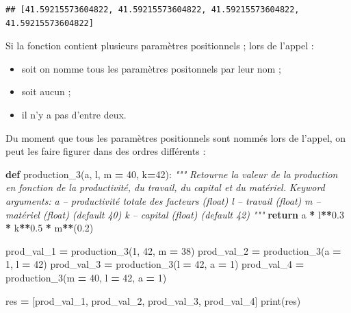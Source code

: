 \documentclass[12pt,]{book}
\newenvironment{Shaded}{\begin{snugshade}}{\end{snugshade}}
\newcommand{\KeywordTok}[1]{\textcolor[rgb]{0.13,0.29,0.53}{\textbf{#1}}}
\newcommand{\DecValTok}[1]{\textcolor[rgb]{0.00,0.00,0.81}{#1}}
\newcommand{\FloatTok}[1]{\textcolor[rgb]{0.00,0.00,0.81}{#1}}
\newcommand{\CommentTok}[1]{\textcolor[rgb]{0.56,0.35,0.01}{\textit{#1}}}
\newcommand{\ControlFlowTok}[1]{\textcolor[rgb]{0.13,0.29,0.53}{\textbf{#1}}}
\newcommand{\OperatorTok}[1]{\textcolor[rgb]{0.81,0.36,0.00}{\textbf{#1}}}
\newcommand{\BuiltInTok}[1]{#1}
\newcommand{\NormalTok}[1]{#1}
\providecommand{\tightlist}{%
  \setlength{\itemsep}{0pt}\setlength{\parskip}{0pt}}
\numberwithin{equation}{section}
\numberwithin{countremarque}{section}
\let\BeginKnitrBlock\begin \let\EndKnitrBlock\end
\begin{document}
\begin{lstlisting}
## [41.59215573604822, 41.59215573604822, 41.59215573604822, 41.59215573604822]
\end{lstlisting}

\BeginKnitrBlock{remarque}
Si la fonction contient plusieurs paramètres positionnels ; lors de
l'appel :

\begin{itemize}
\tightlist
\item
  soit on nomme tous les paramètres positonnels par leur nom ;
\item
  soit aucun ;
\item
  il n'y a pas d'entre deux.
\end{itemize}
\EndKnitrBlock{remarque}

Du moment que tous les paramètres positionnels sont nommés lors de
l'appel, on peut les faire figurer dans des ordres différents :

\begin{Shaded}
\begin{Highlighting}[]
\KeywordTok{def}\NormalTok{ production_3(a, l, m }\OperatorTok{=} \DecValTok{40}\NormalTok{, k}\OperatorTok{=}\DecValTok{42}\NormalTok{):}
  \CommentTok{"""}
\CommentTok{  Retourne la valeur de la production en fonction}
\CommentTok{  de la productivité, du travail, du capital et du matériel.}
\CommentTok{  }
\CommentTok{  Keyword arguments:}
\CommentTok{  a -- productivité totale des facteurs (float)}
\CommentTok{  l -- travail (float)}
\CommentTok{  m -- matériel (float) (default 40)}
\CommentTok{  k -- capital (float) (default 42)}
\CommentTok{  """}
  \ControlFlowTok{return}\NormalTok{ a }\OperatorTok{*}\NormalTok{ l}\OperatorTok{**}\FloatTok{0.3} \OperatorTok{*}\NormalTok{ k}\OperatorTok{**}\FloatTok{0.5} \OperatorTok{*}\NormalTok{ m}\OperatorTok{**}\NormalTok{(}\FloatTok{0.2}\NormalTok{)}
  
\NormalTok{prod_val_1 }\OperatorTok{=}\NormalTok{ production_3(}\DecValTok{1}\NormalTok{, }\DecValTok{42}\NormalTok{, m }\OperatorTok{=} \DecValTok{38}\NormalTok{)}
\NormalTok{prod_val_2 }\OperatorTok{=}\NormalTok{ production_3(a }\OperatorTok{=} \DecValTok{1}\NormalTok{, l }\OperatorTok{=} \DecValTok{42}\NormalTok{)}
\NormalTok{prod_val_3 }\OperatorTok{=}\NormalTok{ production_3(l }\OperatorTok{=} \DecValTok{42}\NormalTok{, a }\OperatorTok{=} \DecValTok{1}\NormalTok{)}
\NormalTok{prod_val_4 }\OperatorTok{=}\NormalTok{ production_3(m }\OperatorTok{=} \DecValTok{40}\NormalTok{, l }\OperatorTok{=} \DecValTok{42}\NormalTok{, a }\OperatorTok{=} \DecValTok{1}\NormalTok{)}

\NormalTok{res }\OperatorTok{=}\NormalTok{ [prod_val_1, prod_val_2, prod_val_3, prod_val_4]}
\BuiltInTok{print}\NormalTok{(res)}
\end{Highlighting}
\end{Shaded}
\end{document}
